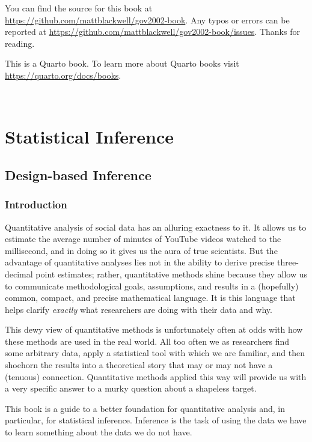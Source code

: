 \documentclass[
  13pt,
  letterpaper,
  DIV=11,
  numbers=noendperiod]{scrreprt}
\theoremstyle{plain}
\theoremstyle{definition}
\theoremstyle{definition}
\theoremstyle{remark}
\begin{document}

You can find the source for this book at
\url{https://github.com/mattblackwell/gov2002-book}. Any typos or errors
can be reported at
\url{https://github.com/mattblackwell/gov2002-book/issues}. Thanks for
reading.

This is a Quarto book. To learn more about Quarto books visit
\url{https://quarto.org/docs/books}.

\(\,\) \(\,\)

\part{Statistical Inference}

\chapter{Design-based Inference}\label{sec-design-based}

\section{Introduction}\label{introduction}

Quantitative analysis of social data has an alluring exactness to it. It
allows us to estimate the average number of minutes of YouTube videos
watched to the millisecond, and in doing so it gives us the aura of true
scientists. But the advantage of quantitative analyses lies not in the
ability to derive precise three-decimal point estimates; rather,
quantitative methods shine because they allow us to communicate
methodological goals, assumptions, and results in a (hopefully) common,
compact, and precise mathematical language. It is this language that
helps clarify \emph{exactly} what researchers are doing with their data
and why.

This dewy view of quantitative methods is unfortunately often at odds
with how these methods are used in the real world. All too often we as
researchers find some arbitrary data, apply a statistical tool with
which we are familiar, and then shoehorn the results into a theoretical
story that may or may not have a (tenuous) connection. Quantitative
methods applied this way will provide us with a very specific answer to
a murky question about a shapeless target.

This book is a guide to a better foundation for quantitative analysis
and, in particular, for statistical inference. Inference is the task of
using the data we have to learn something about the data we do not have.
\end{document}

